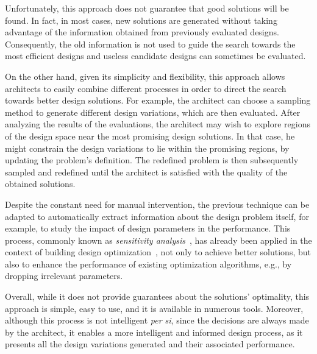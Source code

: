 Unfortunately, this approach does not guarantee that good solutions will be found. In fact, in most cases, new solutions are generated without taking advantage of the information obtained from previously evaluated designs. Consequently, the old information is not used to guide the search towards the most efficient designs and useless candidate designs can sometimes be evaluated. 

On the other hand, given its simplicity and flexibility, this approach allows architects to easily combine different processes in order to direct the search towards better design solutions. For example, the architect can choose a sampling method to generate different design variations, which are then evaluated. After analyzing the results of the evaluations, the architect may wish to explore regions of the design space near the most promising design solutions. In that case, he might constrain the design variations to lie within the promising regions, by updating the problem’s definition. The redefined problem is then subsequently sampled and redefined until the architect is satisfied with the quality of the obtained solutions.
	
Despite the constant need for manual intervention, the previous technique can be adapted to automatically extract information about the design problem itself, for example, to study the impact of design parameters in the performance. This process, commonly known as \textit{sensitivity analysis}~\cite{Saltelli2007}, has already been applied in the context of building design optimization~\cite{Tian2013}, not only to achieve better solutions, but also to enhance the performance of existing optimization algorithms, e.g., by dropping irrelevant parameters.

Overall, while it does not provide guarantees about the solutions’ optimality, this approach is simple, easy to use, and it is available in numerous tools. Moreover, although this process is not intelligent \textit{per si}, since the decisions are always made by the architect, it enables a more intelligent and informed design process, as it presents all the design variations generated and their associated performance.
	
